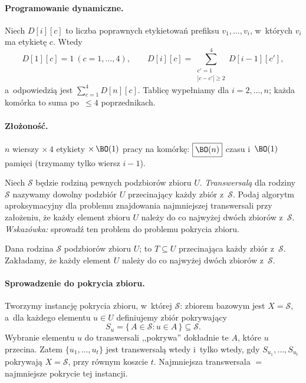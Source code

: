 \paragraph{Programowanie dynamiczne.}
Niech $D[i][c]$ to liczba poprawnych etykietowań prefiksu $v_1,\dots,v_i$,
w~których $v_i$ ma etykietę $c$. Wtedy
\[
	D[1][c]=1\ (c=1,\dots,4),\qquad
	D[i][c]=\!\!\sum_{\substack{c'=1\\|c-c'|\geq 2}}^{4}\!\! D[i-1][c'],
\]
a~odpowiedzią jest $\sum_{c=1}^{4} D[n][c]$. Tablicę wypełniamy dla
$i=2,\dots,n$; każda komórka to suma po~$\leq 4$ poprzednikach.

\paragraph{Złożoność.}
$n$ wierszy $\times\,4$ etykiety $\times\,\BO(1)$ pracy na komórkę:
$\boxed{\BO(n)}$ czasu i~$\BO(1)$ pamięci (trzymamy tylko wiersz $i-1$).

\clearpage
\begin{zadanie}
	Niech $\mathcal{S}$ będzie rodziną pewnych podzbiorów zbioru $U$.
	\emph{Transwersalą} dla rodziny $\mathcal{S}$ nazywamy dowolny podzbiór $U$
	przecinający każdy zbiór z~$\mathcal{S}$. Podaj algorytm aproksymacyjny dla
	problemu znajdowania najmniejszej transwersali przy założeniu, że każdy
	element zbioru $U$ należy do co najwyżej dwóch zbiorów z~$\mathcal{S}$.
	\emph{Wskazówka:} sprowadź ten problem do problemu pokrycia zbioru.
\end{zadanie}

Dana rodzina $\mathcal{S}$ podzbiorów zbioru $U$;  to
$T\subseteq U$ przecinająca każdy zbiór z~$\mathcal{S}$. Zakładamy, że każdy
element $U$ należy do co najwyżej dwóch zbiorów z~$\mathcal{S}$.

\paragraph{Sprowadzenie do pokrycia zbioru.}
Tworzymy instancję pokrycia zbioru, w~której 
$\mathcal{S}$: zbiorem bazowym jest $X=\mathcal{S}$, a~dla każdego elementu
$u\in U$ definiujemy zbiór pokrywający
\[
	S_u=\{\,A\in\mathcal{S} : u\in A\,\}\subseteq\mathcal{S}.
\]
Wybranie elementu $u$ do transwersali ,,pokrywa'' dokładnie te $A$, które $u$
przecina. Zatem $\{u_1,\dots,u_t\}$ jest transwersalą wtedy i~tylko wtedy, gdy
$S_{u_1},\dots,S_{u_t}$ pokrywają $X=\mathcal{S}$, przy równym koszcie $t$.
Najmniejsza transwersala $=$ najmniejsze pokrycie tej instancji.

